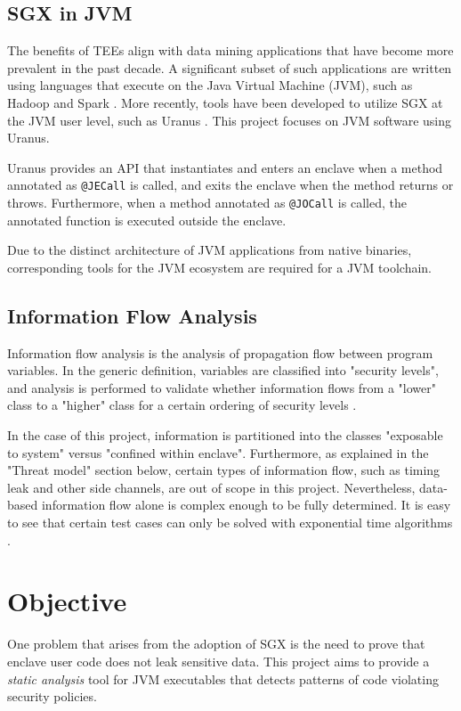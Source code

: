 \documentclass[a4paper, 10pt]{article}
\begin{document}
\subsection{SGX in JVM}
The benefits of TEEs align with data mining applications
that have become more prevalent in the past decade.
A significant subset of such applications are written
using languages that execute on the Java Virtual Machine (JVM),
such as Hadoop \cite{apachehadoop} and Spark \cite{apachespark}.
More recently, tools have been developed to utilize SGX at the JVM user level,
such as Uranus \cite{uranus}.
This project focuses on JVM software using Uranus.

Uranus provides an API that instantiates and enters an enclave
when a method annotated as \texttt{@JECall} is called,
and exits the enclave when the method returns or throws.
Furthermore, when a method annotated as \texttt{@JOCall} is called,
the annotated function is executed outside the enclave.

Due to the distinct architecture of JVM applications from native binaries,
corresponding tools for the JVM ecosystem are required for a JVM toolchain.

\subsection{Information Flow Analysis}
Information flow analysis is the analysis of propagation flow between program variables.
In the generic definition, variables are classified into "security levels",
and analysis is performed to validate whether
information flows from a "lower" class to a "higher" class
for a certain ordering of security levels
\cite{SmithGeoffrey2007PoSI}.

In the case of this project, information is partitioned into the classes
"exposable to system" versus "confined within enclave".
Furthermore, as explained in the "Threat model" section below,
certain types of information flow, such as timing leak and other side channels,
are out of scope in this project.
Nevertheless, data-based information flow alone is complex enough to be fully determined.
It is easy to see that certain test cases can only be solved with exponential time algorithms
\cite{SmithGeoffrey2007PoSI}.

\section{Objective}
One problem that arises from the adoption of SGX is
the need to prove that enclave user code does not leak sensitive data.
This project aims to provide a \emph{static analysis} tool for JVM executables
that detects patterns of code violating security policies.
\end{document}
